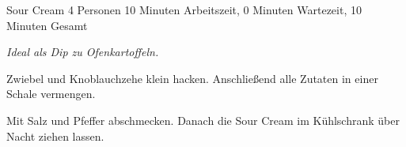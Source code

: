 \begin{recipe}{Sour Cream} {4 Personen} {10 Minuten Arbeitszeit, 0 Minuten Wartezeit, 10 Minuten Gesamt}

  \freeform{}\textit{Ideal als Dip zu Ofenkartoffeln.}


  Zwiebel und Knoblauchzehe klein hacken.
  Anschließend alle Zutaten in einer Schale vermengen.


  Mit Salz und Pfeffer abschmecken.
  Danach die Sour Cream im Kühlschrank über Nacht ziehen lassen.

  \freeform{}\hrulefill{}

\end{recipe}
